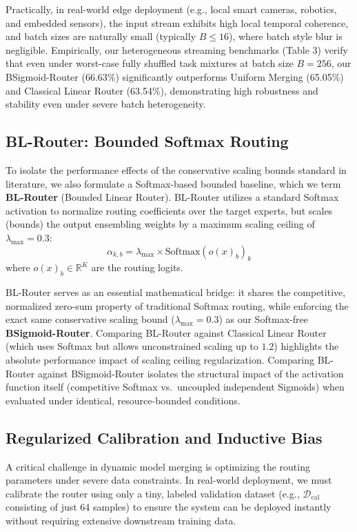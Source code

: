 Practically, in real-world edge deployment (e.g., local smart cameras, robotics, and embedded sensors), the input stream exhibits high local temporal coherence, and batch sizes are naturally small (typically $B \le 16$), where batch style blur is negligible. Empirically, our heterogeneous streaming benchmarks (Table 3) verify that even under worst-case fully shuffled task mixtures at batch size $B=256$, our BSigmoid-Router (66.63\%) significantly outperforms Uniform Merging (65.05\%) and Classical Linear Router (63.54\%), demonstrating high robustness and stability even under severe batch heterogeneity.

\subsection{BL-Router: Bounded Softmax Routing}
To isolate the performance effects of the conservative scaling bounds standard in literature, we also formulate a Softmax-based bounded baseline, which we term \textbf{BL-Router} (Bounded Linear Router). BL-Router utilizes a standard Softmax activation to normalize routing coefficients over the target experts, but scales (bounds) the output ensembling weights by a maximum scaling ceiling of $\lambda_{\text{max}} = 0.3$:
\begin{equation}
    \alpha_{k, b} = \lambda_{\text{max}} \times \text{Softmax}(o(x)_b)_k
\end{equation}
where $o(x)_b \in \mathbb{R}^K$ are the routing logits.

BL-Router serves as an essential mathematical bridge: it shares the competitive, normalized zero-sum property of traditional Softmax routing, while enforcing the exact same conservative scaling bound ($\lambda_{\text{max}} = 0.3$) as our Softmax-free \textbf{BSigmoid-Router}. Comparing BL-Router against Classical Linear Router (which uses Softmax but allows unconstrained scaling up to $1.2$) highlights the absolute performance impact of scaling ceiling regularization. Comparing BL-Router against BSigmoid-Router isolates the structural impact of the activation function itself (competitive Softmax vs.\ uncoupled independent Sigmoids) when evaluated under identical, resource-bounded conditions.

\subsection{Regularized Calibration and Inductive Bias}
A critical challenge in dynamic model merging is optimizing the routing parameters under severe data constraints. In real-world deployment, we must calibrate the router using only a tiny, labeled validation dataset (e.g., $\mathcal{D}_{\text{cal}}$ consisting of just 64 samples) to ensure the system can be deployed instantly without requiring extensive downstream training data.

